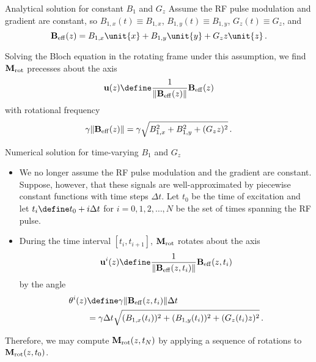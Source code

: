 \documentclass{beamer}
\begin{document}
\begin{frame}{Analytical solution for constant $B_1$ and $G_z$}
Assume the RF pulse modulation and gradient are constant, so $B_{1,x}(t) \equiv B_{1,x}$, $B_{1,y}(t) \equiv B_{1,y}$, $G_z(t) \equiv G_z$, and
\begin{equation*}
\mathbf{B}_{\rm eff}(z) =  B_{1,x}\unit{x}+B_{1,y}\unit{y}+G_zz\unit{z}\,.
\end{equation*}

Solving the Bloch equation in the rotating frame under this assumption, we find $\mathbf{M}_{\rm rot}$ precesses about the axis
\begin{equation*}
\mathbf{u}(z) \define \frac{1}{\|\mathbf{B}_{\rm eff}(z)\|}\mathbf{B}_{\rm eff}(z)
\end{equation*}
with rotational frequency
\begin{equation*}
\gamma \|\mathbf{B}_{\rm eff}(z)\| = \gamma \sqrt{B_{1,x}^2+B_{1,y}^2+(G_zz)^2}\,.
\end{equation*}
\end{frame}

\begin{frame}{Numerical solution for time-varying $B_1$ and $G_z$}
\begin{itemize}
\item We no longer assume the RF pulse modulation and the gradient are constant. Suppose, however, that these signals are well-approximated by piecewise constant functions with time steps $\Delta t$. Let $t_0$ be the time of excitation and let $t_i \define t_0 + i\Delta t$ for $i = 0,1, 2, \ldots, N$ be the set of times spanning the RF pulse.
\item During the time interval $[t_i,t_{i+1}]$, $\mathbf{M}_{\rm rot}$ rotates about the axis
\begin{equation*}
\mathbf{u}^i(z) \define \frac{1}{\|\mathbf{B}_{\rm eff}(z,t_i)\|}\mathbf{B}_{\rm eff}(z,t_i)
\end{equation*}
by the angle
\begin{equation*}
\begin{aligned}
\theta^i(z) &\define \gamma\|\mathbf{B}_{\rm eff}(z,t_i)\|\Delta t\\
 &= \gamma \Delta t \sqrt{(B_{1,x}(t_i))^2+(B_{1,y}(t_i))^2+(G_z(t_i)z)^2}\,.
 \end{aligned}
\end{equation*}
\end{itemize}
\end{frame}

\begin{frame}
Therefore, we may compute $\mathbf{M}_{\rm rot}(z,t_N)$ by applying a sequence of rotations to $\mathbf{M}_{\rm rot}(z,t_0)$.
\end{frame}
\end{document}
